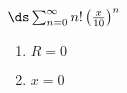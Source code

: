 {$\ds\sum_{n=0}^\infty n!\left(\frac x{10}\right)^n$
}
{\begin{enumerate}
	\item $R=0$
	\item	$x=0$
\end{enumerate}
}
